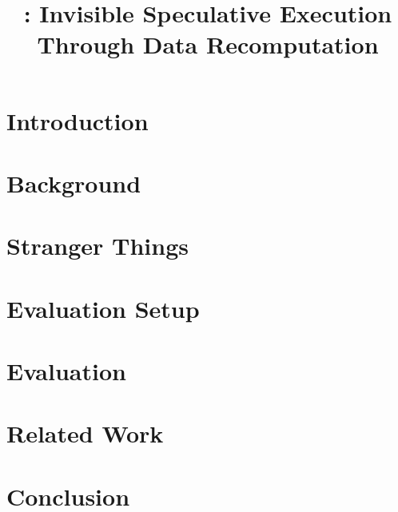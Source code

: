 \documentclass[conference]{IEEEtran}
\title{\arch: Invisible Speculative Execution Through Data Recomputation}
\author{}
\begin{document}
\maketitle
\thispagestyle{firstpage}
\pagestyle{plain}


\begin{abstract}

\end{abstract}

\section{Introduction}
\label{sec:intro}


\section{Background}
\label{sec:back}


\section{\arch}
\label{sec:arch}


\section{Stranger Things} %
\label{sec:stranger-things}


\section{Evaluation Setup}
\label{sec:setup}


\section{Evaluation}
\label{sec:eval}


\section{Related Work}
\label{sec:rel}


\section{Conclusion}
\label{sec:conc}


%




\end{document}
